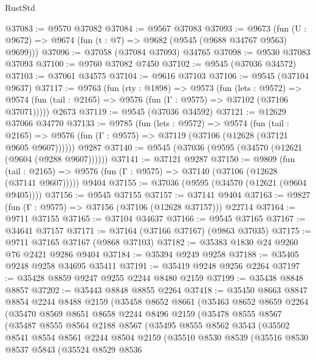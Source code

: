 \begin{lexlean}{RustStd}
\begin{coremodule}
@37083 := @9570 @37082
@37084 := @9567 @37083
@37093 := @9673
    (fun (U : @9672) => @9674 (fun (t : @7) => @9682 (@9545 (@9688 @34767 @9563) @9699)))
@37096 := @37058 (@37084 @37093) @34765
@37098 := @9530 @37083 @37093
@37100 := @9760 @37082 @7450
@37102 := @9545 (@37036 @34572)
@37103 := @37061 @34575
@37104 := @9616 @37103
@37106 := @9545 (@37104 @9637)
@37117 := @9763
    (fun (rty : @1898) =>
    @9573
      (fun (lets : @9572) =>
      @9574 (fun (tail : @2165) => @9576 (fun (Γ : @9575) => @37102 (@37106 @37071)))))
    @2673
@37119 := @9545 (@37036 @34592)
@37121 := @12629 @37066 @34770
@37133 := @9785
    (fun (lets : @9572) =>
    @9574
      (fun (tail : @2165) =>
      @9576 (fun (Γ : @9575) => @37119 (@37106 (@12628 (@37121 @9605 @9607))))))
    @9287
@37140 := @9545 (@37036 (@9595 (@34570 (@12621 (@9604 (@9288 @9607))))))
@37141 := @37121 @9287
@37150 := @9809
    (fun (tail : @2165) => @9576 (fun (Γ : @9575) => @37140 (@37106 (@12628 (@37141 @9607)))))
    @9404
@37155 := @37036 (@9595 (@34570 (@12621 (@9604 @9405))))
@37156 := @9545 @37155
@37157 := @37141 @9404
@37163 := @9827 (fun (Γ : @9575) => @37156 (@37106 (@12628 @37157))) @22714
@37164 := @9711 @37155
@37165 := @37104 @34637
@37166 := @9545 @37165
@37167 := @34641 @37157
@37171 := @37164 (@37166 @37167) (@9863 @37035)
@37175 := @9711 @37165 @37167 (@9868 @37103)
@37182 := @35383 @1830 @24 @9260 @76 @2421 @9286 @9404
@37184 := @35394 @9249 @9258
@37188 := @35405 @9248 @9258 @34695 @35411
@37191 := @35419 @9248 @9256 @2264
@37197 := @35428 @8859 @9247 @9255 @2244 @8480 @2159
@37199 := @35438 @8848 @8857
@37202 := @35443 @8848 @8855 @2264
@37418 := @35450
    @8663
    @8847
    @8854
    @2244
    @8488
    @2159
    (@35458
      @8652
      @8661
      (@35463
        @8652
        @8659
        @2264
        (@35470
          @8569
          @8651
          @8658
          @2244
          @8496
          @2159
          (@35478
            @8555
            @8567
            (@35487
              @8555
              @8564
              @2188
              @8567
              (@35495
                @8555
                @8562
                @3543
                (@35502
                  @8541
                  @8554
                  @8561
                  @2244
                  @8504
                  @2159
                  (@35510
                    @8530
                    @8539
                    (@35516
                      @8530
                      @8537
                      @5843
                      (@35524
                        @8529
                        @8536

\end{coremodule}
\end{lexlean}
